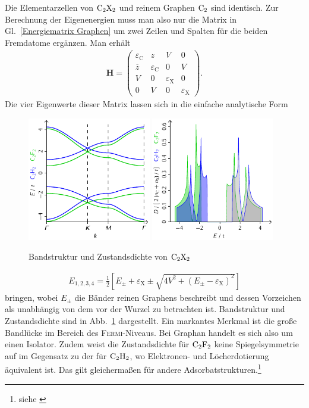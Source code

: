 \documentclass[a4paper, 10pt, twoside, openany]{book} %
\newcommand \bracks[1]{\left [ #1 \right ]}
\def \vec {\boldsymbol}
\def \eC {\varepsilon_\mathrm{C}}
\def \eX {\varepsilon_\mathrm{X}}
\begin{document}
	Die Elementarzellen von $\rm C_2X_2$ und reinem Graphen $\rm C_2$ sind identisch. Zur Berechnung der Eigenenergien muss man also nur die Matrix in Gl.~\ref{Energiematrix Graphen} um zwei Zeilen und Spalten für die beiden Fremdatome ergänzen. Man erhält
	\begin{align*}
		\vec H =
		\begin{pmatrix}
            \eC         & z   &   V &  0 \\
            \overline z & \eC &   0 &  V \\
             V          & 0   & \eX &  0 \\
             0          & V   &   0 & \eX
		\end{pmatrix}.
	\end{align*}
	Die vier Eigenwerte dieser Matrix lassen sich in die einfache analytische Form
	\begin{figure}
		\includegraphics[width=0.48\textwidth]{Abbildungen/Bandstrukturen/C2X2.pdf}
		\hfill
		\includegraphics[width=0.48\textwidth]{Abbildungen/Bandstrukturen/DOS_C2X2.pdf}
		\caption{Bandstruktur und Zustandsdichte von $\rm C_2X_2$}
		\label{C2X2}
	\end{figure}
	\begin{align*}
		E_{1, 2, 3, 4} = \frac 1 2 \bracks{E_\pm + \eX \pm \sqrt{4 V^2 + (E_\pm - \eX)^2}}
	\end{align*}
	bringen, wobei $E_\pm$ die Bänder reinen Graphens beschreibt und dessen Vorzeichen als unabhängig von dem vor der Wurzel zu betrachten ist. Bandstruktur und Zustandsdichte sind in Abb.~\ref{C2X2} dargestellt. Ein markantes Merkmal ist die große Bandlücke im Bereich des \textsc{Fermi}-Niveaus. Bei Graphan handelt es sich also um einen Isolator. Zudem weist die Zustandsdichte für $\rm C_2F_2$ keine Spiegelsymmetrie auf im Gegensatz zu der für $\rm C_2H_2$, wo Elektronen- und Löcherdotierung äquivalent ist. Das gilt gleichermaßen für andere Adsorbatstrukturen.\footnote{siehe \cite[S. 3]{Wehling2}}
	
\end{document}
